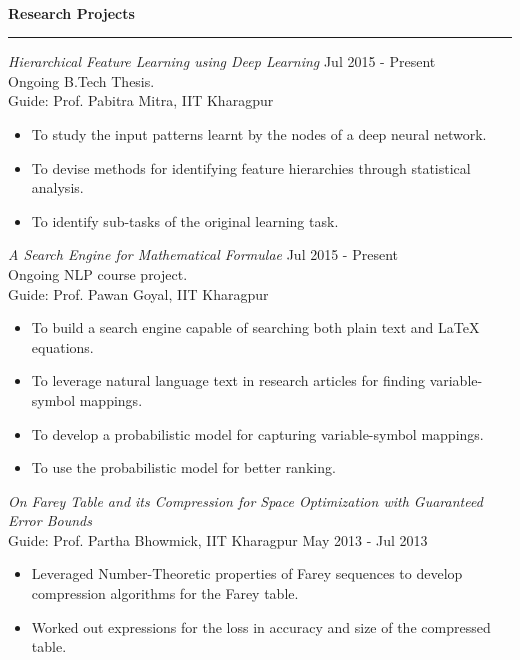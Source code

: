 \documentclass[a4paper,10pt,oneside]{article}
\newcommand{\heading}[1]{
 {\Large \textbf{#1}}
  \vspace{0.4em}
  \hrule
  \vspace{0.4em}
}
\newcommand{\SmallEntryGap}{ \vspace{0.6em} }
\newcommand{\EntryGap}{ ~\\ }
\begin{document}

\EntryGap
\heading{Research Projects}
\SmallEntryGap
\emph{Hierarchical Feature Learning using Deep Learning} \hfill Jul 2015 - Present\\
Ongoing B.Tech Thesis.\\
Guide: Prof. Pabitra Mitra, IIT Kharagpur
\begin{itemize}[noitemsep, nolistsep]
  \item To study the input patterns learnt by the nodes of a deep neural network.
  \item To devise methods for identifying feature hierarchies through statistical analysis.
  \item To identify sub-tasks of the original learning task.
\end{itemize}

\SmallEntryGap

\emph{A Search Engine for Mathematical Formulae} \hfill Jul 2015 - Present \\
Ongoing NLP course project.\\
Guide: Prof. Pawan Goyal, IIT Kharagpur
\begin{itemize}[noitemsep, nolistsep]
 \item To build a search engine capable of searching both plain text and LaTeX equations.
 \item To leverage natural language text in research articles for finding variable-symbol mappings.
 \item To develop a probabilistic model for capturing variable-symbol mappings.
 \item To use the probabilistic model for better ranking.
\end{itemize}

\SmallEntryGap

\emph{On Farey Table and its Compression for Space Optimization with Guaranteed Error Bounds} \\
Guide: Prof. Partha Bhowmick, IIT Kharagpur \hfill May 2013 - Jul 2013 \\
\begin{itemize}[noitemsep, nolistsep]
 \item Leveraged Number-Theoretic properties of Farey sequences to develop compression algorithms for the Farey table.
 \item Worked out expressions for the loss in accuracy and size of the compressed table.
\end{itemize}
\end{document}
